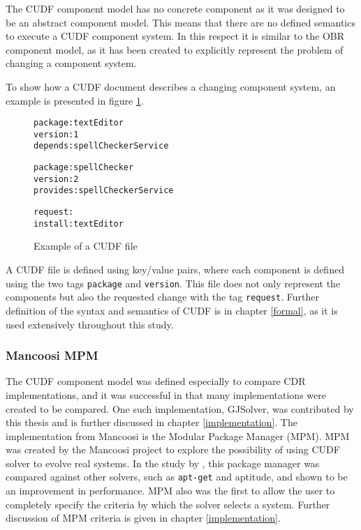The CUDF component model has no concrete component as it was designed to be an abstract component model.
This means that there are no defined semantics to execute a CUDF component system.
In this respect it is similar to the OBR component model, as it has been created to explicitly represent the problem of changing a component system.

To show how a CUDF document describes a changing component system, an example is presented in figure \ref{CUDFmetadata}.

\begin{figure}[htp] 
\begin{center}
\begin{alltt}
package: textEditor
version: 1
depends: spellCheckerService

package: spellChecker
version: 2
provides: spellCheckerService

request:
install:textEditor

\end{alltt}
  \caption{Example of a CUDF file}
  \label{CUDFmetadata}
\end{center}
\end{figure}

A CUDF file is defined using key/value pairs, where each component is defined using the two tags \texttt{package} and \texttt{version}.
This file does not only represent the components but also the requested change with the tag \texttt{request}.
Further definition of the syntax and semantics of CUDF is in chapter \ref{formal}, as it is used extensively throughout this study.

\subsubsection{Mancoosi MPM}
The CUDF component model was defined especially to compare CDR implementations, and it was successful in that many implementations were created to be compared.
One such implementation, GJSolver, was contributed by this thesis and is further discussed in chapter \ref{implementation}.
The implementation from Mancoosi is the Modular Package Manager \citep{abate2011} (MPM).
MPM was created by the Mancoosi project to explore the possibility of using CUDF solver to evolve real systems.
In the study by \cite{abate2011}, this package manager was compared against other solvers, such as \texttt{apt-get} and aptitude, and shown to be an improvement in performance.
MPM also was the first to allow the user to completely specify the criteria by which the solver selects a system.
Further discussion of MPM criteria is given in chapter \ref{implementation}. 

